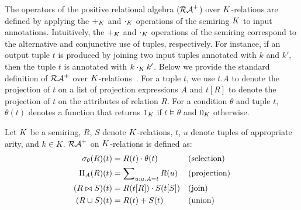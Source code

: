 
The operators of the positive relational algebra ($\mathcal{RA}^{+}$) over
$K$-relations are defined by applying the $+_K$ and
$\cdot_K$ operations of the semiring $K$ to input
annotations. Intuitively, the $+_K$ and $\cdot_K$ operations
of the semiring correspond to the alternative and
conjunctive use of tuples, respectively. For instance, if an output tuple $t$ is
produced by joining two input tuples annotated with $k$ and $k'$, then
the tuple $t$ is annotated with $k \cdot_K k'$. Below we provide
the standard definition of $\mathcal{RA}^{+}$ over
$K$-relations~\cite{GK07}. For a tuple $t$, we use $t.A$ to denote the projection
of $t$ on a list of projection expressions $A$ and $t[R]$ to
denote the projection of $t$ on the attributes of relation
$R$. For a condition $\theta$ and tuple $t$, $\theta(t)$ denotes a
function that returns $1_{K}$ if $t \models \theta$ and
$0_{K}$ otherwise.

\begin{defi}
  Let $K$ be a semiring, $R$, $S$ denote $K$-relations,
 $t$, $u$ denote
  tuples of appropriate arity, and $k \in K$.  %
  $\mathcal{RA}^{+}$ on
  $K$-relations is defined as:
%
\begin{align*}
  \selection_\theta(R)(t) &= R(t) \cdot \theta(t) && (\text{selection}) \\
  \projection_A(R)(t) &= \sum\nolimits_{u: u.A = t} R(u) && (\text{projection}) \\
  (R \join S)(t) &= R(t[R]) \cdot S(t[S]) && (\text{join}) \\
  (R \union S)(t) &= R(t) + S(t) && (\text{union})
%
\end{align*}
\end{defi}

